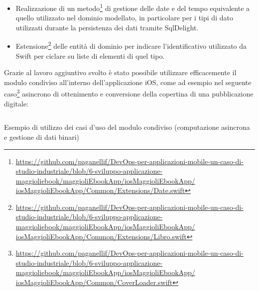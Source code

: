 \begin{itemize}
    \item Realizzazione di un metodo\footnote{\href{https://github.com/paganellif/DevOps-per-applicazioni-mobile-un-caso-di-studio-industriale/blob/6-sviluppo-applicazione-maggioliebook/maggioliEbookApp/iosMaggioliEbookApp/iosMaggioliEbookApp/Common/Extensions/Date.swift}{https://github.com/paganellif/DevOps-per-applicazioni-mobile-un-caso-di-studio-industriale/blob/6-sviluppo-applicazione-maggioliebook/maggioliEbookApp/iosMaggioliEbookApp/\\iosMaggioliEbookApp/Common/Extensions/Date.swift}} di gestione delle date e del tempo equivalente a quello utilizzato nel dominio modellato, in particolare per i tipi di dato utilizzati durante la persistenza dei dati tramite SqlDelight.
    
    \item Estensione\footnote{\href{https://github.com/paganellif/DevOps-per-applicazioni-mobile-un-caso-di-studio-industriale/blob/6-sviluppo-applicazione-maggioliebook/maggioliEbookApp/iosMaggioliEbookApp/iosMaggioliEbookApp/Common/Extensions/Libro.swift}{https://github.com/paganellif/DevOps-per-applicazioni-mobile-un-caso-di-studio-industriale/blob/6-sviluppo-applicazione-maggioliebook/maggioliEbookApp/iosMaggioliEbookApp/\\iosMaggioliEbookApp/Common/Extensions/Libro.swift}} delle entità di dominio per indicare l'identificativo utilizzato da Swift per ciclare su liste di elementi di quel tipo.
\end{itemize}

Grazie al lavoro aggiuntivo svolto è stato possibile utilizzare efficacemente il modulo condiviso all'interno dell'applicazione iOS, 
come ad esempio nel seguente caso\footnote{\href{https://github.com/paganellif/DevOps-per-applicazioni-mobile-un-caso-di-studio-industriale/blob/6-sviluppo-applicazione-maggioliebook/maggioliEbookApp/iosMaggioliEbookApp/iosMaggioliEbookApp/Common/CoverLoader.swift}{https://github.com/paganellif/DevOps-per-applicazioni-mobile-un-caso-di-studio-industriale/blob/6-sviluppo-applicazione-maggioliebook/maggioliEbookApp/iosMaggioliEbookApp/\\iosMaggioliEbookApp/Common/CoverLoader.swift}} asincrono di ottenimento e conversione della copertina di una pubblicazione digitale:

\begin{listing}[H]
    \inputminted{swift}{code/CoverLoader.swift}
    \caption{Esempio di utilizzo dei casi d'uso del modulo condiviso (computazione asincrona e gestione di dati binari)}
\end{listing}

